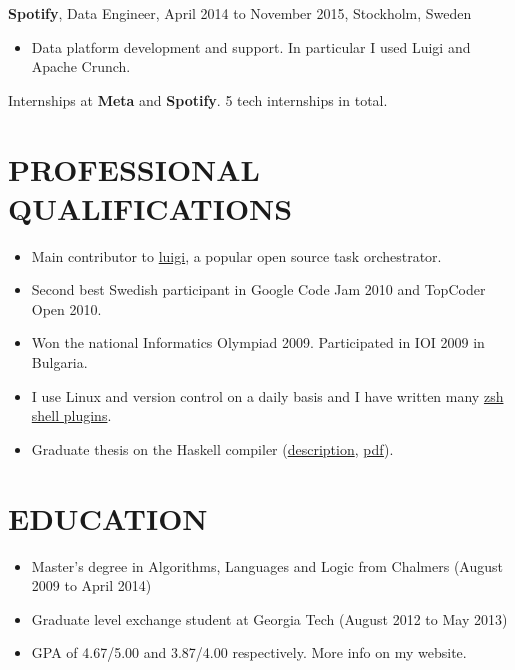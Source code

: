 \documentclass[11pt]{res} %
\begin{document}
\begin{resume}
\textbf{Spotify}, {\footnotesize Data Engineer, April 2014 to November 2015}, Stockholm, Sweden
\vspace{0.2in}
   \begin{itemize}
     \item Data platform development and support. In particular I used Luigi and Apache Crunch.
 \end{itemize}

Internships at \textbf{Meta} and \textbf{Spotify}. 5 tech internships in total.

\section{PROFESSIONAL QUALIFICATIONS}
   \begin{itemize} %
   \item
     Main contributor to \href{https://github.com/spotify/luigi}{luigi}, a
     popular open source task orchestrator.
   \item Second best Swedish participant in
    Google Code Jam 2010 and TopCoder Open 2010.
   \item Won the national Informatics Olympiad 2009. Participated in IOI 2009 in Bulgaria.
   \item I use Linux and version control 
     on a daily basis and I have written many
     \href{https://github.com/search?q=\%40Tarrasch+zsh+OR+antigen\&type=Repositories\&ref=searchresults}{zsh shell plugins}.
   \item Graduate thesis on the Haskell compiler (\href{https://www.arashrouhani.com/papers.html}{description}, \href{https://www.arashrouhani.com/papers/master-thesis.pdf}{pdf}).
 \end{itemize}

\section{EDUCATION}
 \begin{itemize} %
   \item Master's degree in Algorithms, Languages and Logic from Chalmers
     ({\footnotesize August 2009 to April 2014})
   \item Graduate level exchange student at Georgia Tech
     ({\footnotesize August 2012 to May 2013})
   \item GPA of 4.67/5.00 and 3.87/4.00 respectively. More info on my website.
 \end{itemize}


\end{resume}
\end{document}
